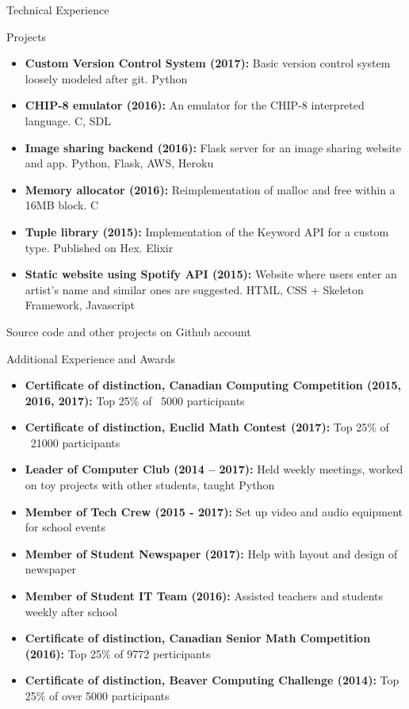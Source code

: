 \documentclass[]{mcdowellcv}
\begin{document}
    \begin{cvsection}{Technical Experience}
        \begin{cvsubsection}{Projects}{}{}
            \begin{itemize}
                \item \textbf{Custom Version Control System (2017):} Basic version control system loosely modeled after git. Python
                \item \textbf{CHIP-8 emulator (2016):} An emulator for the CHIP-8 interpreted language. C, SDL
                \item \textbf{Image sharing backend (2016):} Flask server for an image sharing website and app. Python, Flask, AWS, Heroku
                \item \textbf{Memory allocator (2016):} Reimplementation of malloc and free within a 16MB block. C
                \item \textbf{Tuple library (2015):} Implementation of the Keyword API for a custom type. Published on Hex. Elixir
                \item \textbf{Static website using Spotify API (2015):} Website where users enter an artist's name and similar ones are suggested. HTML, CSS + Skeleton Framework, Javascript
            \end{itemize}
            Source code and other projects on Github account
        \end{cvsubsection}
    \end{cvsection}

    \begin{cvsection}{Additional Experience and Awards}
        \begin{cvsubsection}{}{}{}
            \begin{itemize}
                \item \textbf{Certificate of distinction, Canadian Computing Competition (2015, 2016, 2017):} Top 25\% of ~5000 participants
                \item \textbf{Certificate of distinction, Euclid Math Contest (2017):} Top 25\% of ~21000 participants
                \item \textbf{Leader of Computer Club (2014 – 2017):} Held weekly meetings, worked on toy projects with other students, taught Python
                \item \textbf{Member of Tech Crew (2015 - 2017):} Set up video and audio equipment for school events
                \item \textbf{Member of Student Newspaper (2017):} Help with layout and design of newspaper
                \item \textbf{Member of Student IT Team (2016):} Assisted teachers and students weekly after school
                \item \textbf{Certificate of distinction, Canadian Senior Math Competition (2016):} Top 25\% of 9772 perticipants
                \item \textbf{Certificate of distinction, Beaver Computing Challenge (2014):} Top 25\% of over 5000 participants
            \end{itemize}
        \end{cvsubsection}
    \end{cvsection}
\end{document}
